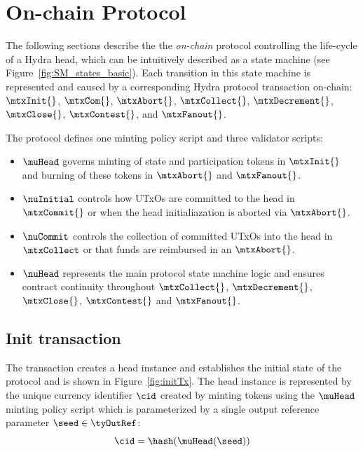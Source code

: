 \clearpage
\section{On-chain Protocol}\label{sec:on-chain}


The following sections describe the the \emph{on-chain} protocol controlling the
life-cycle of a Hydra head, which can be intuitively described as a state
machine (see Figure~\ref{fig:SM_states_basic}). Each transition in this state
machine is represented and caused by a corresponding Hydra protocol transaction
on-chain: $\mtxInit{}$, $\mtxCom{}$, $\mtxAbort{}$, $\mtxCollect{}$,
$\mtxDecrement{}$, $\mtxClose{}$, $\mtxContest{}$, and $\mtxFanout{}$.


\noindent The protocol defines one minting policy script and three validator scripts:
\begin{itemize}
	\item $\muHead$ governs minting of state and participation tokens in
	      $\mtxInit{}$ and burning of these tokens in $\mtxAbort{}$ and
	      $\mtxFanout{}$.
	\item $\nuInitial$ controls how UTxOs are committed to the head in
	      $\mtxCommit{}$ or when the head initialiazation is aborted via
	      $\mtxAbort{}$.
	\item $\nuCommit$ controls the collection of committed UTxOs into the head in
	      $\mtxCollect$ or that funds are reimbursed in an $\mtxAbort{}$.
	\item $\nuHead$ represents the main protocol state machine logic and ensures
	      contract continuity throughout $\mtxCollect{}$, $\mtxDecrement{}$,
	      $\mtxClose{}$, $\mtxContest{}$ and $\mtxFanout{}$.
\end{itemize}

\subsection{Init transaction}\label{sec:init-tx}

The \mtxInit{} transaction creates a head instance and establishes the initial
state of the protocol and is shown in Figure~\ref{fig:initTx}. The head
instance is represented by the unique currency identifier $\cid$ created by
minting tokens using the $\muHead$ minting policy script which is parameterized
by a single output reference parameter $\seed \in \tyOutRef$:
\[
	\cid = \hash(\muHead(\seed))
\]

